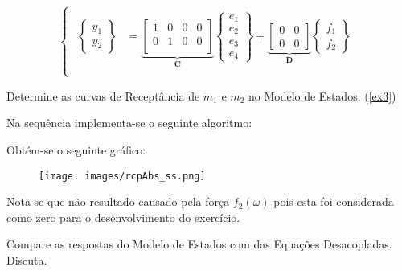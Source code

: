 \documentclass{article}
\begin{document}
\begin{resolution}
\begin{equation}
\begin{cases}
\begin{aligned}
            \begin{Bmatrix} y_1\\ y_2 \end{Bmatrix} &=
            \underbrace{
                \begin{bmatrix}
                    1 & 0 & 0 & 0\\
                    0 & 1 & 0 & 0\\
                \end{bmatrix}}_{\mathbf{C}}
            \begin{Bmatrix} e_{1}\\ e_{2}\\ e_{3}\\ e_{4} \end{Bmatrix} + 
            \underbrace{\begin{bmatrix} 0 & 0\\ 0 & 0 \end{bmatrix}}_{\mathbf{D}}
            \begin{Bmatrix} f_1\\f_2 \end{Bmatrix}\\
        \end{aligned}
        \end{cases}
    \end{equation}
\end{resolution}


\newpage\begin{exercise}\label{ex10}
    Determine as curvas de Receptância de $m_1$ e $m_2$ no Modelo de Estados. (\ref{ex3})
\end{exercise}
\begin{resolution}
    Na sequência implementa-se o seguinte algoritmo:
    \begin{scriptsize}
        \myMatlab
    \end{scriptsize}
    Obtém-se o seguinte gráfico:
    \begin{figure}[H]
        \centering
        \texttt{[image: images/rcpAbs\_ss.png]}
    \end{figure}
    Nota-se que não resultado causado pela força $f_2(\omega)$ pois esta foi considerada como zero para o desenvolvimento do exercício.
\end{resolution}


\newpage\begin{exercise}\label{ex11}
    Compare as respostas do Modelo de Estados com das Equações Desacopladas. Discuta.
\end{exercise}
\begin{resolution}
    
\end{resolution}
\end{document}
